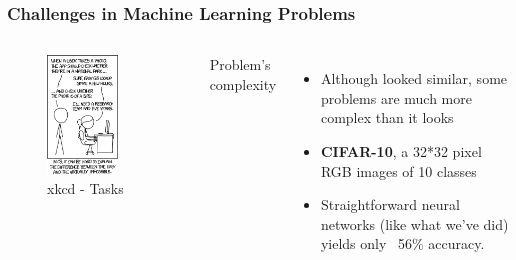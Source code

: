 \documentclass[aspectratio=169]{beamer}
\begin{document}
\begin{frame}
	\frametitle{Challenges in Machine Learning Problems}
	\begin{columns}
		\begin{figure}
			\includegraphics[width=0.7\textwidth]{imgs/xkcd_tasks.png}
			\caption{xkcd - Tasks}
		\end{figure}
		\begin{center}
			{\onslide<2-> \Huge Problem's complexity}
		\end{center}
		\begin{itemize}
			\item<3-> Although looked similar, some problems are much more complex than it looks
			\item<4-> \textbf{CIFAR-10}, a 32*32 pixel RGB images of 10 classes
			\item<5-> Straightforward neural networks (like what we've did) yields only ~56\% accuracy.
		\end{itemize}
	\end{columns}
\end{frame}
\end{document}
